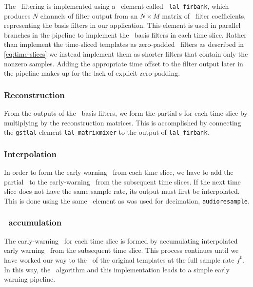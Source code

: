 The \fir\ filtering is implemented using a \gstlal\ element called {\tt
lal\_firbank}, which produces $N$ channels of filter output from an $N\times M$ matrix of
\fir\ filter coefficients, representing the \SVD{} basis filters in our application.  This element is used in parallel branches in the
pipeline to implement the \SVD\ basis filters in each time
slice.  Rather than implement the time-sliced templates as zero-padded \fir\
filters as described in \eqref{eq:time-slices} we instead implement them as shorter
filters that contain only the nonzero samples.  Adding the appropriate time
offset to the filter output later in the pipeline makes up for the lack of
explicit zero-padding.

\subsubsection{Reconstruction}

From the outputs of the \SVD\ basis filters, we form the partial \SNR{}s for each time 
slice by multiplying by the reconstruction matrices.  This is accomplished by connecting 
the \texttt{gstlal} element \texttt{lal\_matrixmixer} to the output of
\texttt{lal\_firbank}.

\subsubsection{Interpolation}

In order to form the early-warning \SNR\ from each time slice, we have to add
the partial \SNR\ to the early-warning \SNR\ from the subsequent time slices.
If the next time slice does not have the same sample rate, its output must
first be interpolated.  This is done using the same \gstreamer\ element as was
used for decimation, {\tt audioresample}.  

\subsubsection{\SNR\ accumulation}

The early-warning \SNR\ for each time slice is formed by accumulating interpolated early
warning \SNR\ from the subsequent time slice.  This process continues until we have 
worked our way to the \SNR\ of the original templates at the full sample rate $f^0$.  In 
this way, the \lloid\ algorithm and this implementation leads to a simple early warning
pipeline.
